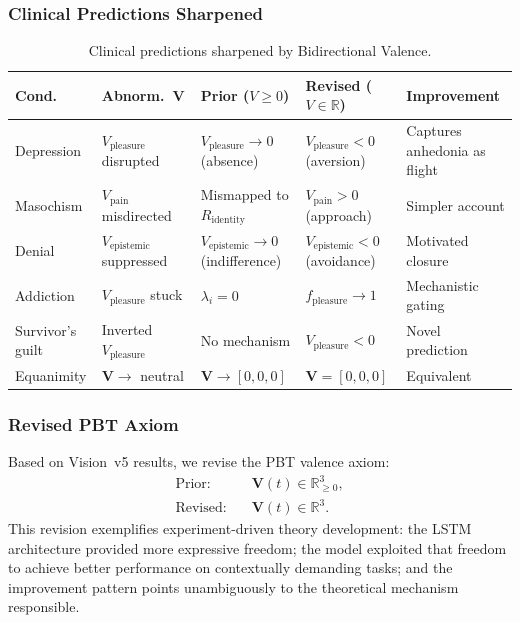 \documentclass[12pt,a4paper]{article}
\newcommand{\Rid}{R_{\mathrm{identity}}}
\newcommand{\vpain}{V_{\mathrm{pain}}}
\newcommand{\vpleasure}{V_{\mathrm{pleasure}}}
\newcommand{\vepi}{V_{\mathrm{epistemic}}}
\begin{document}
\subsubsection{Clinical Predictions Sharpened}

\begin{table}[ht]
\centering
\caption{Clinical predictions sharpened by Bidirectional Valence.}
\label{tab:clinical_V}
\small
\begin{tabular}{@{}L{1.9cm}L{2.4cm}L{3.0cm}L{3.0cm}L{2.4cm}@{}}
\toprule
\textbf{Cond.} & \textbf{Abnorm.\ V}
  & \textbf{Prior ($V\!\ge\!0$)} & \textbf{Revised ($V\!\in\!\mathbb{R}$)}
  & \textbf{Improvement} \\
\midrule
Depression & $\vpleasure$ disrupted &
  $\vpleasure\to 0$ (absence) &
  $\vpleasure < 0$ (aversion) &
  Captures anhedonia as flight \\
Masochism & $\vpain$ misdirected &
  Mismapped to $\Rid$ &
  $\vpain > 0$ (approach) &
  Simpler account \\
Denial & $\vepi$ suppressed &
  $\vepi\to 0$ (indifference) &
  $\vepi < 0$ (avoidance) &
  Motivated closure \\
Addiction & $\vpleasure$ stuck &
  $\lambda_i = 0$ &
  $f_{\mathrm{pleasure}}\to 1$ &
  Mechanistic gating \\
Survivor's guilt & Inverted $\vpleasure$ &
  No mechanism &
  $\vpleasure < 0$ &
  Novel prediction \\
Equanimity & $\mathbf{V}\to$ neutral &
  $\mathbf{V}\to[0,0,0]$ &
  $\mathbf{V} = [0,0,0]$ &
  Equivalent \\
\bottomrule
\end{tabular}
\end{table}

\subsubsection{Revised PBT Axiom}

Based on Vision~v5 results, we revise the PBT valence axiom:
\begin{align}
  \text{Prior:}  \quad& \mathbf{V}(t)\in\mathbb{R}^3_{\ge 0},\\
  \text{Revised:}\quad& \mathbf{V}(t)\in\mathbb{R}^3.
  \label{eq:V_revised}
\end{align}
This revision exemplifies experiment-driven theory development: the LSTM
architecture provided more expressive freedom; the model exploited that
freedom to achieve better performance on contextually demanding tasks; and the
improvement pattern points unambiguously to the theoretical mechanism
responsible.
\end{document}
